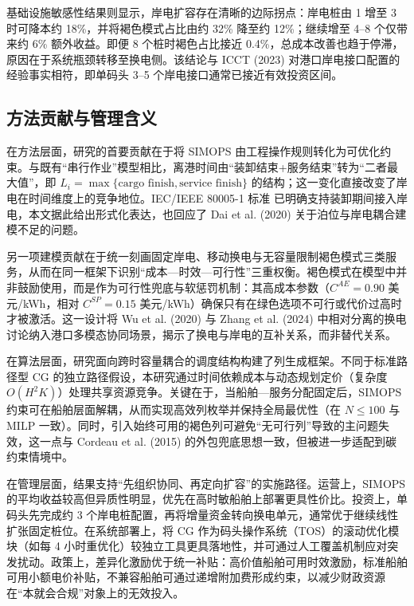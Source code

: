 \documentclass[UTF8, a4paper, 12pt]{ctexart}
\begin{document}
基础设施敏感性结果则显示，岸电扩容存在清晰的边际拐点：岸电桩由 1 增至 3 时可降本约 18\%，并将褐色模式占比由约 32\% 降至约 12\%；继续增至 4--8 个仅带来约 6\% 额外收益。即便 8 个桩时褐色占比接近 0.4\%，总成本改善也趋于停滞，原因在于系统瓶颈转移至换电侧。该结论与 ICCT (2023) \cite{ICCT2023} 对港口岸电接口配置的经验事实相符，即单码头 3--5 个岸电接口通常已接近有效投资区间。

\subsection{方法贡献与管理含义}
\label{sec:contributions}

在方法层面，研究的首要贡献在于将 SIMOPS 由工程操作规则转化为可优化约束。与既有“串行作业”模型相比\cite{Agatz2018, Moshref2020}，离港时间由“装卸结束+服务结束”转为“二者最大值”，即 $L_i=\max\{\text{cargo finish},\text{service finish}\}$ 的结构；这一变化直接改变了岸电在时间维度上的竞争地位。IEC/IEEE 80005-1 标准\cite{IEC80005} 已明确支持装卸期间接入岸电，本文据此给出形式化表达，也回应了 Dai et al. (2020) \cite{Dai2020} 关于泊位与岸电耦合建模不足的问题。

另一项建模贡献在于统一刻画固定岸电、移动换电与无容量限制褐色模式三类服务，从而在同一框架下识别“成本—时效—可行性”三重权衡。褐色模式在模型中并非鼓励使用，而是作为可行性兜底与软惩罚机制：其高成本参数（$C^{AE}=0.90$ 美元/kWh，相对 $C^{SP}=0.15$ 美元/kWh）确保只有在绿色选项不可行或代价过高时才被激活。这一设计将 Wu et al. (2020) \cite{Wu2020_Review} 与 Zhang et al. (2024) \cite{Zhang2024_Voyage} 中相对分离的换电讨论纳入港口多模态协同场景，揭示了换电与岸电的互补关系，而非替代关系。

在算法层面，研究面向跨时容量耦合的调度结构构建了列生成框架。不同于标准路径型 CG 的独立路径假设\cite{Desaulniers2005}，本研究通过时间依赖成本与动态规划定价（复杂度 $O(H^2K)$）处理共享资源竞争。关键在于，当船舶—服务分配固定后，SIMOPS 约束可在船舶层面解耦，从而实现高效列枚举并保持全局最优性（在 $N\le 100$ 与 MILP 一致）。同时，引入始终可用的褐色列可避免“无可行列”导致的主问题失效，这一点与 Cordeau et al. (2015) \cite{Cordeau2015} 的外包兜底思想一致，但被进一步适配到碳约束情境中。

在管理层面，结果支持“先组织协同、再定向扩容”的实施路径。运营上，SIMOPS 的平均收益较高但异质性明显，优先在高时敏船舶上部署更具性价比。投资上，单码头先完成约 3 个岸电桩配置，再将增量资金转向换电单元，通常优于继续线性扩张固定桩位。在系统部署上，将 CG 作为码头操作系统（TOS）的滚动优化模块（如每 4 小时重优化）较独立工具更具落地性，并可通过人工覆盖机制应对突发扰动。政策上，差异化激励优于统一补贴：高价值船舶可用时效激励，标准船舶可用小额电价补贴，不兼容船舶可通过递增附加费形成约束，以减少财政资源在“本就会合规”对象上的无效投入。
\end{document}
